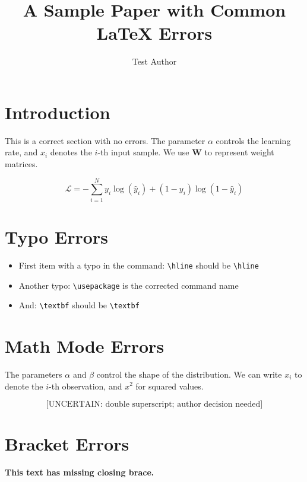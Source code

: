 \documentclass{article}
\title{A Sample Paper with Common LaTeX Errors}
\author{Test Author}
\begin{document}
\maketitle

\section{Introduction}

This is a correct section with no errors. The parameter $\alpha$ controls the learning rate,
and $x_i$ denotes the $i$-th input sample. We use $\mathbf{W}$ to represent weight matrices.

\begin{equation}
  \mathcal{L} = -\sum_{i=1}^{N} y_i \log(\hat{y}_i) + (1 - y_i) \log(1 - \hat{y}_i)
\end{equation}

\section{Typo Errors}

\begin{itemize}
  \item First item with a typo in the command: \verb|\hline| should be \verb|\hline|
  \item Another typo: \verb|\usepackage| is the corrected command name
  \item And: \verb|\textbf| should be \verb|\textbf|
\end{itemize}

\section{Math Mode Errors}

The parameters $\alpha$ and $\beta$ control the shape of the distribution.
We can write $x_i$ to denote the $i$-th observation, and $x^2$ for squared values.

\begin{equation}
  \text{[UNCERTAIN: double superscript; author decision needed]}
\end{equation}

\section{Bracket Errors}

\textbf{This text has missing closing brace.}
\end{document}
